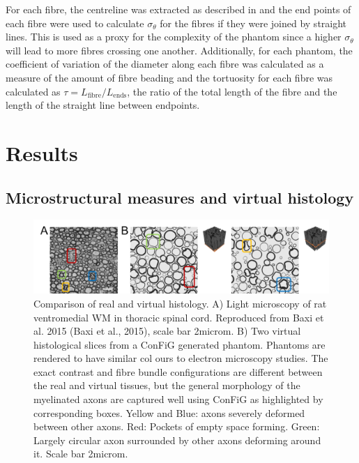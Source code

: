 For each fibre, the centreline was extracted as described in  and the end points of each fibre were used to calculate $\sigma_\theta$ for the fibres if they were joined by straight lines.
This is used as a proxy for the complexity of the phantom since a higher $\sigma_\theta$ will lead to more fibres crossing one another.
Additionally, for each phantom, the coefficient of variation of the diameter along each fibre was calculated as a measure of the amount of fibre beading and the tortuosity for each fibre was calculated as $\tau=L_{\mathrm{fibre}}/L_{\mathrm{ends}}$, the ratio of the total length of the fibre and the length of the straight line between endpoints.



\section{Results}
\label{sec:micro_results}

\subsection{Microstructural measures and virtual histology}
\label{sec:config_result_micro_meas}

\begin{figure}
  \centering
  \includegraphics[width=\textwidth]{figures/config/virthist1_wbox_whitebg.png}
  \caption[Comparison of real and virtual histology]{Comparison of real  and virtual histology. A) Light microscopy of rat ventromedial WM in thoracic spinal cord. Reproduced from Baxi et al. 2015 (Baxi et al., 2015), scale bar 2microm. B) Two virtual histological slices from a \ac{ConFiG} generated phantom. Phantoms are rendered to have similar col ours to electron microscopy studies. The exact contrast and fibre bundle configurations are different between the real and virtual tissues, but the general morphology of the myelinated axons are captured well using \ac{ConFiG} as highlighted by corresponding boxes. Yellow and Blue: axons severely deformed between other axons. Red: Pockets of empty space forming. Green: Largely circular axon surrounded by other axons deforming around it. Scale bar 2microm.}
  \label{fig:config_res_real_vs_virt_hist}
\end{figure}

